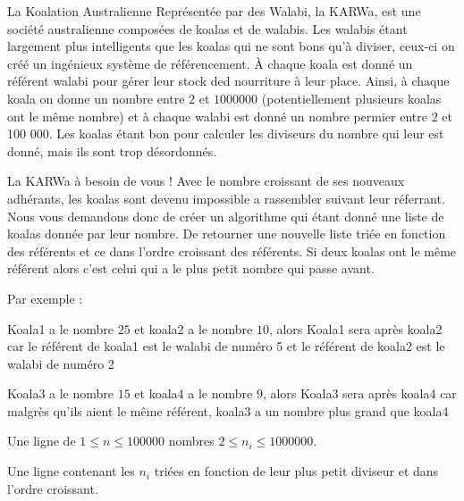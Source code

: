 \problemname{\problemyamlname}

La Koalation Australienne Représentée par des Walabi, la KARWa, est une société australienne
composées de koalas et de walabis. Les walabis étant largement plus intelligents que les koalas qui ne sont bons qu'à diviser,
ceux-ci on créé un ingénieux système de référencement. À chaque koala est donné un référent walabi pour gérer leur stock ded nourriture à leur place.
Ainsi, à chaque koala on donne un nombre entre $2$ et $1 000 000$ (potentiellement plusieurs koalas ont le même nombre) et à chaque walabi est donné un nombre permier entre 2 et 100 000.
Les koalas étant bon pour calculer les diviseurs du nombre qui leur est donné, mais ils sont trop désordonnés.

La KARWa à besoin de vous ! Avec le nombre croissant de ses nouveaux adhérants, les koalas sont devenu impossible a rassembler suivant leur réferrant.
Nous vous demandons donc de créer un algorithme qui étant donné une liste de koalas donnée par leur nombre. De retourner une nouvelle liste
triée en fonction des référents et ce dans l'ordre croissant des référents.
Si deux koalas ont le même référent alors c'est celui qui a le plus petit nombre qui passe avant.

Par exemple :

Koala1 a le nombre $25$ et koala2 a le nombre $10$,
alors Koala1 sera après koala2 car le référent de koala1 est le walabi de numéro 5 et le référent de koala2 est le walabi de numéro 2

Koala3 a le nombre $15$ et koala4 a le nombre $9$,
alors Koala3 sera après koala4 car malgrès qu'ils aient le même référent, koala3 a un nombre plus grand que koala4

\begin{Input}
	Une ligne de $1 \leq n \leq 100 000$ nombres $2 \leq n_i \leq 1 000 000$.
\end{Input}

\begin{Output}
	Une ligne contenant les $n_i$ triées en fonction de leur plus petit diviseur et dans l'ordre croissant.
\end{Output}

